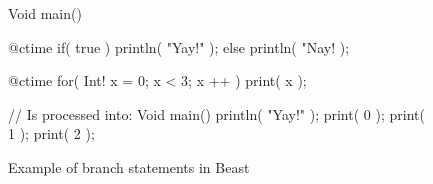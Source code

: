 \documentclass{ExcelAtFIT}
\begin{document}
\begin{figure}[h]
	\begin{code}
Void main() {
	@ctime if( true )
		println( "Yay!" );
	else
		println( "Nay! );
		
	@ctime for( Int! x = 0; x < 3; x ++ )
		print( x );
}

// Is processed into:
Void main() {
	println( "Yay!" );
	print( 0 );
	print( 1 );
	print( 2 );
}
	\end{code}
	\label{fig:yayNayCode}
	\caption{Example of \ctime branch statements in Beast}
\end{figure}

\begin{comment}
\section{Implementation details}
\begin{figure*}[tbh]\centering %
	\centering
	\texttt{[image: compiling\_interpretation.pdf]}
	\caption{Diagram of code processing workflow in Dragon (Beast compiler)}
	\label{fig:compilationInterpretationDia}
\end{figure*}

It is clear that an implementation of the code hatching concept requires the compiler to be able to execute any code during compilation. However for optimal performance, two different interpreters are needed.

\begin{figure}[h]
	\begin{code}
Void main() {
	for( Int! x = 0; x < 50; x ++ ) {
		@ctime Type! T = Int;
		T a = 5;
		T = Bool;
		T b = true;
	}
}
	
// Is processed into:
Void main() {
	for( Int! x = 0; x < 50; x ++ ) {
		Int a = 5;
		Bool b = true;
	}
}
	\end{code}
	\caption{Demonstration of two-level interpretation}
	\label{fig:twoLevelIpret}
\end{figure}

In Figure \ref{fig:twoLevelIpret}, it is not possible to compile the code into standard assembly (or intermediate code) until variable \inlineCode{a} and \inlineCode{b} declarations (which depend on \ctime variable \inlineCode{T}) are resolved. This means that the \ctime code has to be executed in-place and the semantic tree must be built simultaneously with the \ctime code being interpreted (also called \textit{first-order interpretation}). Results of the \textit{first-order interpretation} directly affect further variable definitions and call bindings (as demonstrated in Figure \ref{fig:astctime}), so intermediate code for a first-order interpreter cannot contain more information than an abstract syntax tree (AST). That means that intermediate code generation for the first-order interpreter is pointless.


\end{comment}
\end{document}
